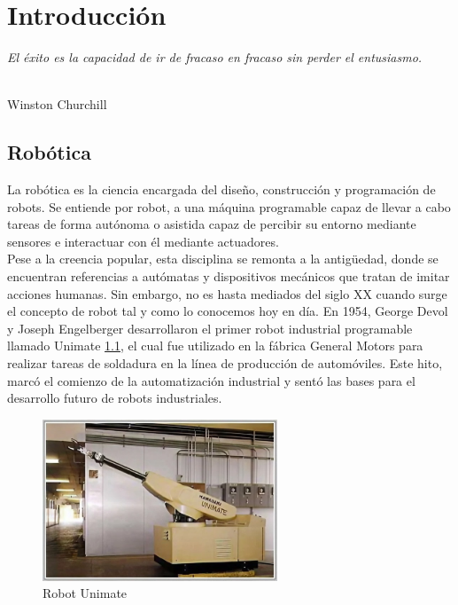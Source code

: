 \chapter{Introducción}
\label{cap:capitulo1}
\setcounter{page}{1}

\begin{flushright}
\begin{minipage}[]{10cm}
\emph{El éxito es la capacidad de ir de fracaso en fracaso sin perder el entusiasmo.}\\
\end{minipage}\\

Winston Churchill\\
\end{flushright}


\section{Robótica}
\label{sec:rob}
La robótica es la ciencia encargada del diseño, construcción y programación de robots. Se entiende por robot, a una máquina programable 
capaz de llevar a cabo tareas de forma autónoma o asistida capaz de percibir su entorno mediante sensores e interactuar con él mediante 
actuadores.\\
Pese a la creencia popular, esta disciplina se remonta a la antigüedad, donde se encuentran referencias a autómatas y dispositivos mecánicos  
que tratan de imitar acciones humanas. Sin embargo, no es hasta mediados del siglo XX cuando surge el concepto de robot tal y como lo conocemos hoy en día. 
En 1954, George Devol y Joseph Engelberger desarrollaron el primer robot industrial programable llamado Unimate \ref{fig:unimate}, el cual fue utilizado en la fábrica General Motors 
para realizar tareas de soldadura en la línea de producción de automóviles. Este hito, marcó el comienzo de la automatización industrial y sentó las bases para 
el desarrollo futuro de robots industriales.
\begin{figure} [ht!]
  \begin{center}
    \includegraphics[width=7cm]{figs/unimate.jpg}
  \end{center}
  \caption{Robot Unimate}
  \label{fig:unimate}
\end{figure}\ 
